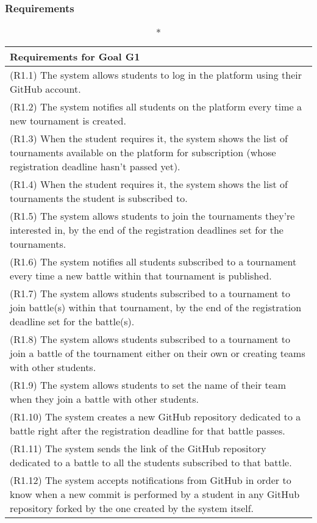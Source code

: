 \subsubsection{Requirements}

\renewcommand{\arraystretch}{1.9}

\begin{longtable}{|p{16.5cm}|}
	\caption*{Requirements for Goal G1}
	\\
	\hline
(R1.1) The system allows students to log in the platform using their GitHub account. \\ 
\hline
(R1.2) The system notifies all students on the platform every time a new tournament is created.\\
\hline
(R1.3) When the student requires it, the system shows the list of tournaments available on the platform for subscription (whose registration deadline hasn't passed yet). \\
\hline
(R1.4) When the student requires it, the system shows the list of tournaments the student is subscribed to.\\
\hline
(R1.5) The system allows students to join the tournaments they’re interested in, by the end of the registration deadlines set for the tournaments.  \\
\hline
(R1.6) The system notifies all students subscribed to a tournament every time a new battle within that tournament is published.  \\
\hline
(R1.7) The system allows students subscribed to a tournament to join battle(s) within that tournament, by the end of the registration deadline set for the battle(s). \\
\hline
(R1.8) The system allows students subscribed to a tournament to join a battle of the tournament either on their own or creating teams with other students.  \\
\hline
(R1.9) The system allows students to set the name of their team when they join a battle with other students.\\
\hline
(R1.10) The system creates a new GitHub repository dedicated to a battle right after the registration deadline for that battle passes. \\
\hline
(R1.11) The system sends the link of the GitHub repository dedicated to a battle to all the students subscribed to that battle.\\
\hline
(R1.12) The system accepts notifications from GitHub in order to know when a new commit is performed by a student in any GitHub repository forked by the one created by the system itself.\\

\end{longtable}
